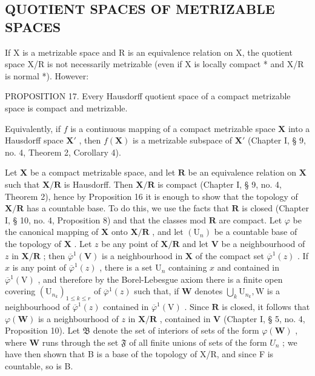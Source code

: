 \subsection{QUOTIENT SPACES OF METRIZABLE SPACES}

If X is a metrizable space and R is an equivalence relation on X, the quotient space X/R is not necessarily metrizable (even if X is locally compact * and X/R is normal *). However:

PROPOSITION 17. Every Hausdorff quotient space of a compact metrizable space is compact and metrizable.

Equivalently, if \(f\) is a continuous mapping of a compact metrizable space \(\mathbf{X}\) into a Hausdorff space \(\mathbf{X}'\) , then \(f(\mathbf{X})\) is a metrizable subspace of \(\mathbf{X}'\) (Chapter I, § 9, no. 4, Theorem 2, Corollary 4).

Let \(\mathbf{X}\) be a compact metrizable space, and let \(\mathbf{R}\) be an equivalence relation on \(\mathbf{X}\) such that \(\mathbf{X} / \mathbf{R}\) is Hausdorff. Then \(\mathbf{X} / \mathbf{R}\) is compact (Chapter I, § 9, no. 4, Theorem 2), hence by Proposition 16 it is enough to show that the topology of \(\mathbf{X} / \mathbf{R}\) has a countable base. To do this, we use the facts that \(\mathbf{R}\) is closed (Chapter I, § 10, no. 4, Proposition 8) and that the classes mod \(\mathbf{R}\) are compact. Let \(\varphi\) be the canonical mapping of \(\mathbf{X}\) onto \(\mathbf{X} / \mathbf{R}\) , and let \((\mathrm{U}_n)\) be a countable base of the topology of \(\mathbf{X}\) . Let \(z\) be any point of \(\mathbf{X} / \mathbf{R}\) and let \(\mathbf{V}\) be a neighbourhood of \(z\) in \(\mathbf{X} / \mathbf{R}\) ; then \(\overline{\varphi}^1 (\mathbf{V})\) is a neighbourhood in \(\mathbf{X}\) of the compact set \(\overline{\varphi}^1 (z)\) . If \(x\) is any point of \(\overline{\varphi}^1 (z)\) , there is a set \(\mathrm{U}_n\) containing \(x\) and contained in \(\overline{\varphi}^1 (\mathrm{V})\) , and therefore by the Borel-Lebesgue axiom there is a finite open covering \((\mathrm{U}_{n_k})_{1\leqslant k\leqslant r}\) of \(\overline{\varphi}^1 (z)\) such that, if \(\mathbf{W}\) denotes \(\bigcup_{k}\mathrm{U}_{n_k},\mathrm{W}\) is a neighbourhood of \(\overline{\varphi}^1 (z)\) contained in \(\overline{\varphi}^1 (\mathrm{V})\) . Since \(\mathbf{R}\) is closed, it follows that \(\varphi (\mathbf{W})\) is a neighbourhood of \(z\) in \(\mathbf{X} / \mathbf{R}\) , contained in \(\mathbf{V}\) (Chapter I, § 5, no. 4, Proposition 10). Let \(\mathfrak{B}\) denote the set of interiors of sets of the form \(\varphi (\mathbf{W})\) , where \(\mathbf{W}\) runs through the set \(\mathfrak{F}\) of all finite unions of sets of the form \(U_{n}\) ; we have then shown that B is a base of the topology of X/R, and since F is countable, so is B.

